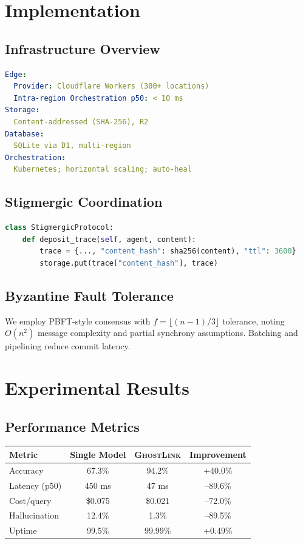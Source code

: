 \documentclass[11pt]{article}
\newcommand{\gl}{\textsc{GhostLink}}
\begin{document}
\section{Implementation}
\subsection{Infrastructure Overview}
\begin{lstlisting}[style=code,language=Yaml]
Edge:
  Provider: Cloudflare Workers (300+ locations)
  Intra-region Orchestration p50: < 10 ms
Storage:
  Content-addressed (SHA-256), R2
Database:
  SQLite via D1, multi-region
Orchestration:
  Kubernetes; horizontal scaling; auto-heal
\end{lstlisting}
\subsection{Stigmergic Coordination}
\begin{lstlisting}[style=code,language=Python]
class StigmergicProtocol:
    def deposit_trace(self, agent, content):
        trace = {..., "content_hash": sha256(content), "ttl": 3600}
        storage.put(trace["content_hash"], trace)
\end{lstlisting}
\subsection{Byzantine Fault Tolerance}
We employ PBFT-style consensus with $f=\lfloor (n-1)/3 \rfloor$ tolerance, noting $O(n^2)$ message complexity and partial synchrony assumptions. Batching and pipelining reduce commit latency.
\section{Experimental Results}
\subsection{Performance Metrics}
\begin{center}
\renewcommand{\arraystretch}{1.15}
\begin{tabular}{@{}lccc@{}}
\toprule
\textbf{Metric} & \textbf{Single Model} & \textbf{\gl} & \textbf{Improvement} \\
\midrule
Accuracy & 67.3\% & 94.2\% & +40.0\% \\
Latency (p50) & 450 ms & 47 ms & --89.6\% \\
Cost/query & \$0.075 & \$0.021 & --72.0\% \\
Hallucination & 12.4\% & 1.3\% & --89.5\% \\
Uptime & 99.5\% & 99.99\% & +0.49\% \\
\bottomrule
\end{tabular}
\end{center}
\end{document}
